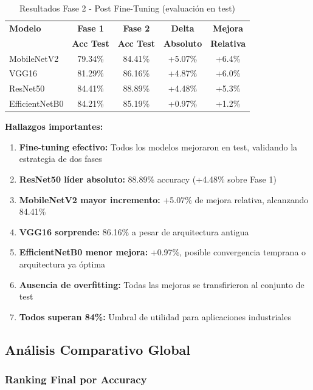 \documentclass[11pt, a4paper]{article}
\begin{document}
\begin{table}[H]
\centering
\caption{Resultados Fase 2 - Post Fine-Tuning (evaluación en test)}
\label{tab:tl_phase2_results}
\begin{tabular}{@{}lcccc@{}}
\toprule
\textbf{Modelo} & \textbf{Fase 1} & \textbf{Fase 2} & \textbf{Delta} & \textbf{Mejora} \\
 & \textbf{Acc Test} & \textbf{Acc Test} & \textbf{Absoluto} & \textbf{Relativa} \\
\midrule
MobileNetV2    & 79.34\%  & 84.41\%  & +5.07\%  & +6.4\% \\
VGG16          & 81.29\%  & 86.16\%  & +4.87\%  & +6.0\% \\
ResNet50       & 84.41\%  & 88.89\%  & +4.48\%  & +5.3\% \\
EfficientNetB0 & 84.21\%  & 85.19\%  & +0.97\%  & +1.2\% \\
\bottomrule
\end{tabular}
\end{table}

\textbf{Hallazgos importantes:}

\begin{enumerate}
    \item \textbf{Fine-tuning efectivo:} Todos los modelos mejoraron en test, validando la estrategia de dos fases
    \item \textbf{ResNet50 líder absoluto:} 88.89\% accuracy (+4.48\% sobre Fase 1)
    \item \textbf{MobileNetV2 mayor incremento:} +5.07\% de mejora relativa, alcanzando 84.41\%
    \item \textbf{VGG16 sorprende:} 86.16\% a pesar de arquitectura antigua
    \item \textbf{EfficientNetB0 menor mejora:} +0.97\%, posible convergencia temprana o arquitectura ya óptima
    \item \textbf{Ausencia de overfitting:} Todas las mejoras se transfirieron al conjunto de test
    \item \textbf{Todos superan 84\%:} Umbral de utilidad para aplicaciones industriales
\end{enumerate}

\subsection{Análisis Comparativo Global}

\subsubsection{Ranking Final por Accuracy}
\end{document}
